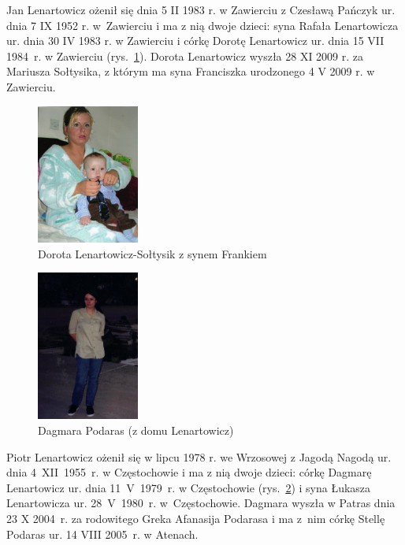 Jan Lenartowicz ożenił się dnia 5 II 1983 r. w Zawierciu z Czesławą Pańczyk ur. dnia 7 IX 1952 r. w~Zawierciu i ma z nią dwoje dzieci: syna Rafała Lenartowicza ur. dnia 30 IV 1983 r. w Zawierciu i córkę Dorotę Lenartowicz ur. dnia 15 VII 1984~r. w Zawierciu (rys.~\ref{rys:dorota_lenartowicz_z_synem_frankiem}). Dorota Lenartowicz wyszła 28 XI  2009 r. za Mariusza Sołtysika, z którym ma syna Franciszka urodzonego 4 V 2009 r. w Zawierciu.

\begin{figure}[!ht]
\begin{center}
\includegraphics[width=0.3\textwidth]{zdjecia/dorota_lenartowicz_z_synem_frankiem.jpg}
\caption{Dorota Lenartowicz-Sołtysik z synem Frankiem}
\label{rys:dorota_lenartowicz_z_synem_frankiem}
\end{center}
\end{figure}

\begin{figure}[!h]
\begin{center}
\includegraphics[width=0.3\textwidth]{zdjecia/dagmara_lenartowicz_podaras.jpg}
\caption{Dagmara Podaras (z domu Lenartowicz)}
\label{rys:dagmara_lenartowicz_podaras}
\end{center}
\end{figure}

Piotr Lenartowicz ożenił się w lipcu 1978 r. we Wrzosowej z Jagodą Nagodą ur. dnia 4~XII~1955~r. w Częstochowie i ma z nią dwoje dzieci: córkę Dagmarę Lenartowicz ur. dnia 11~V~1979~r. w Częstochowie (rys.~\ref{rys:dagmara_lenartowicz_podaras}) i syna Łukasza Lenartowicza ur. 28~V~1980~r. w~Częstochowie. Dagmara wyszła w Patras dnia 23 X 2004~r. za rodowitego Greka Afanasija Podarasa i ma z~nim córkę Stellę Podaras ur. 14 VIII 2005~r. w Atenach.



